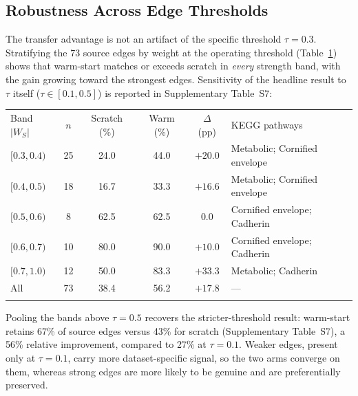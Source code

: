 \documentclass{ws-jbcb}
\begin{document}
\subsection{Robustness Across Edge Thresholds}
\label{sec:sensitivity}

The transfer advantage is not an artifact of the specific threshold $\tau = 0.3$. Stratifying the 73 source edges by weight at the operating threshold (Table~\ref{tab:strat}) shows that warm-start matches or exceeds scratch in \emph{every} strength band, with the gain growing toward the strongest edges. Sensitivity of the headline result to $\tau$ itself ($\tau \in [0.1, 0.5]$) is reported in Supplementary Table~S7:

\begin{table}[b]
{\begin{tabular}{@{}lcccc l@{}} \toprule
Band $|W_S|$ & $n$ & Scratch (\%) & Warm (\%) & $\Delta$ (pp) & KEGG pathways\\\colrule
$[0.3,0.4)$ & 25 & 24.0 & 44.0 & $+20.0$ & Metabolic; Cornified envelope\\
$[0.4,0.5)$ & 18 & 16.7 & 33.3 & $+16.6$ & Metabolic; Cornified envelope\\
$[0.5,0.6)$ & 8 & 62.5 & 62.5 & $0.0$ & Cornified envelope; Cadherin\\
$[0.6,0.7)$ & 10 & 80.0 & 90.0 & $+10.0$ & Cornified envelope; Cadherin\\
$[0.7,1.0)$ & 12 & 50.0 & 83.3 & $+33.3$ & Metabolic; Cadherin\\\colrule
All & 73 & 38.4 & 56.2 & $+17.8$ & ---\\
\botrule
\end{tabular}}
\label{tab:strat}
\end{table}

Pooling the bands above $\tau = 0.5$ recovers the stricter-threshold result: warm-start retains 67\% of source edges versus 43\% for scratch (Supplementary Table~S7), a 56\% relative improvement, compared to 27\% at $\tau = 0.1$. Weaker edges, present only at $\tau = 0.1$, carry more dataset-specific signal, so the two arms converge on them, whereas strong edges are more likely to be genuine and are preferentially preserved.
\end{document}

